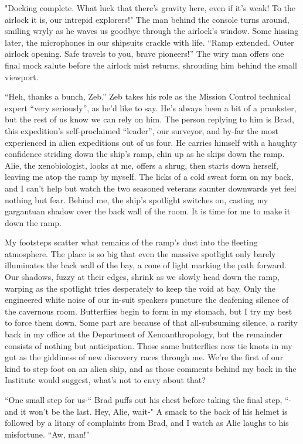 "Docking complete. What luck that there’s gravity here, even if it’s weak! To the airlock it is, our intrepid explorers!" The man behind the console turns around, smiling wryly as he waves us goodbye through the airlock’s window. Some hissing later, the microphones in our shipsuits crackle with life. “Ramp extended. Outer airlock opening. Safe travels to you, brave pioneers!” The wiry man offers one final mock salute before the airlock mist returns, shrouding him behind the small viewport. 

“Heh, thanks a bunch, Zeb.” Zeb takes his role as the Mission Control technical expert “very seriously”, as he’d like to say. He’s always been a bit of a prankster, but the rest of us know we can rely on him. The person replying to him is Brad, this expedition’s self-proclaimed “leader”, our surveyor, and by-far the most experienced in alien expeditions out of us four. He carries himself with a haughty confidence striding down the ship’s ramp, chin up as he skips down the ramp. Alie, the xenobiologist, looks at me, offers a shrug, then starts down herself, leaving me atop the ramp by myself. The licks of a cold sweat form on my back, and I can’t help but watch the two seasoned veterans saunter downwards yet feel nothing but fear. Behind me, the ship’s spotlight switches on, casting my gargantuan shadow over the back wall of the room. It is time for me to make it down the ramp.  

My footsteps scatter what remains of the ramp’s dust into the fleeting atmosphere. The place is so big that even the massive spotlight only barely illuminates the back wall of the bay, a cone of light marking the path forward. Our shadows, fuzzy at their edges, shrink as we slowly head down the ramp, warping as the spotlight tries desperately to keep the void at bay. Only the engineered white noise of our in-suit speakers puncture the deafening silence of the cavernous room. Butterflies begin to form in my stomach, but I try my best to force them down. Some part are because of that all-subsuming silence, a rarity back in my office at the Department of Xenoanthropology, but the remainder consists of nothing but anticipation. Those same butterflies now tie knots in my gut as the giddiness of new discovery races through me. We’re the first of our kind to step foot on an alien ship, and as those comments behind my back in the Institute would suggest, what’s not to envy about that? 

“One small step for us-“ Brad puffs out his chest before taking the final step, “-and it won't be the last. Hey, Alie, wait-" A smack to the back of his helmet is followed by a litany of complaints from Brad, and I watch as Alie laughs to his misfortune. “Aw, man!” 

